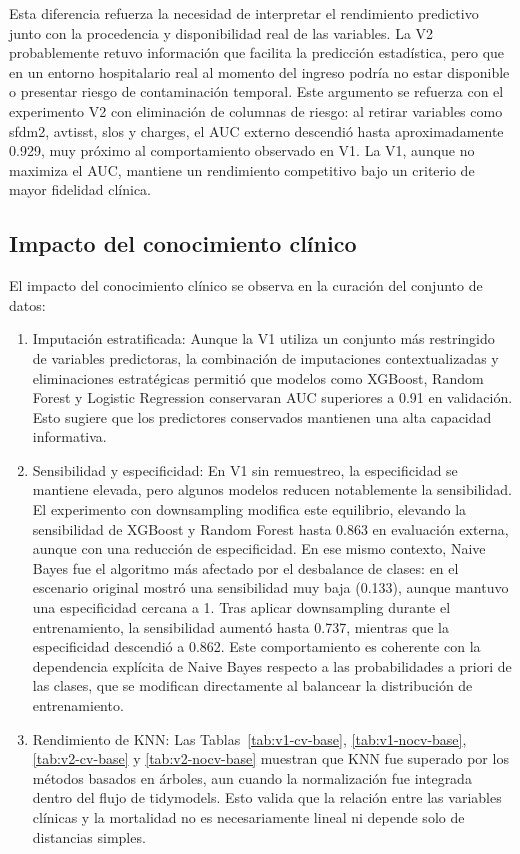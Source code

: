 Esta diferencia refuerza la necesidad de interpretar el rendimiento predictivo
junto con la procedencia y disponibilidad real de las variables. La V2
probablemente retuvo información que facilita la predicción estadística, pero
que en un entorno hospitalario real al momento del ingreso podría no estar
disponible o presentar riesgo de contaminación temporal. Este argumento se
refuerza con el experimento V2 con eliminación de columnas de riesgo: al retirar
variables como sfdm2, avtisst, slos y charges, el AUC externo descendió hasta
aproximadamente 0.929, muy próximo al comportamiento observado en V1. La V1,
aunque no maximiza el AUC, mantiene un rendimiento competitivo bajo un criterio
de mayor fidelidad clínica.

\subsection{Impacto del conocimiento clínico}

El impacto del conocimiento clínico se observa en la curación del conjunto de
datos:

\begin{enumerate}
  \item Imputación estratificada: Aunque la V1 utiliza un conjunto más restringido
    de variables predictoras, la combinación de imputaciones contextualizadas y
    eliminaciones estratégicas permitió que modelos como XGBoost, Random Forest
    y Logistic Regression conservaran AUC superiores a 0.91 en validación. Esto sugiere que los
    predictores conservados mantienen una alta capacidad informativa.
  \item Sensibilidad y especificidad: En V1 sin remuestreo, la especificidad se
    mantiene elevada, pero algunos modelos reducen notablemente la sensibilidad.
    El experimento con downsampling modifica este equilibrio, elevando la
    sensibilidad de XGBoost y Random Forest hasta 0.863 en evaluación externa,
    aunque con una reducción de especificidad.
    En ese mismo contexto, Naive Bayes fue el algoritmo más afectado por el
    desbalance de clases: en el escenario original mostró una sensibilidad muy
    baja (0.133), aunque mantuvo una especificidad cercana a 1. Tras aplicar
    downsampling durante el entrenamiento, la sensibilidad aumentó hasta 0.737,
    mientras que la especificidad descendió a 0.862. Este comportamiento es
    coherente con la dependencia explícita de Naive Bayes respecto a las
    probabilidades a priori de las clases, que se modifican directamente al
    balancear la distribución de entrenamiento.
  \item Rendimiento de KNN: Las Tablas~\ref{tab:v1-cv-base},
    \ref{tab:v1-nocv-base}, \ref{tab:v2-cv-base} y
    \ref{tab:v2-nocv-base} muestran que KNN fue superado por los métodos
    basados en árboles, aun cuando la normalización fue integrada dentro del
    flujo de tidymodels. Esto valida que la relación entre las variables
    clínicas y la mortalidad no es necesariamente lineal ni depende solo de
    distancias simples.
\end{enumerate}

